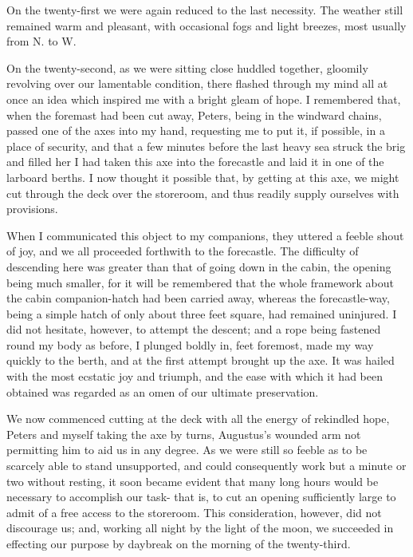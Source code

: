 On the twenty-first we were again reduced to the last necessity. The weather
still remained warm and pleasant, with occasional fogs and light breezes, most
usually from N. to W. 

On the twenty-second, as we were sitting close huddled together, gloomily
revolving over our lamentable condition, there flashed through my mind all at
once an idea which inspired me with a bright gleam of hope. I remembered that,
when the foremast had been cut away, Peters, being in the windward chains,
passed one of the axes into my hand, requesting me to put it, if possible, in a
place of security, and that a few minutes before the last heavy sea struck the
brig and filled her I had taken this axe into the forecastle and laid it in one
of the larboard berths. I now thought it possible that, by getting at this axe,
we might cut through the deck over the storeroom, and thus readily supply
ourselves with provisions. 

When I communicated this object to my companions, they uttered a feeble shout
of joy, and we all proceeded forthwith to the forecastle. The difficulty of
descending here was greater than that of going down in the cabin, the opening
being much smaller, for it will be remembered that the whole framework about the
cabin companion-hatch had been carried away, whereas the forecastle-way, being a
simple hatch of only about three feet square, had remained uninjured. I did not
hesitate, however, to attempt the descent; and a rope being fastened round my
body as before, I plunged boldly in, feet foremost, made my way quickly to the
berth, and at the first attempt brought up the axe. It was hailed with the most
ecstatic joy and triumph, and the ease with which it had been obtained was
regarded as an omen of our ultimate preservation. 

We now commenced cutting at the deck with all the energy of rekindled hope,
Peters and myself taking the axe by turns, Augustus's wounded arm not permitting
him to aid us in any degree. As we were still so feeble as to be scarcely able
to stand unsupported, and could consequently work but a minute or two without
resting, it soon became evident that many long hours would be necessary to
accomplish our task- that is, to cut an opening sufficiently large to admit of a
free access to the storeroom. This consideration, however, did not discourage
us; and, working all night by the light of the moon, we succeeded in effecting
our purpose by daybreak on the morning of the twenty-third. 

